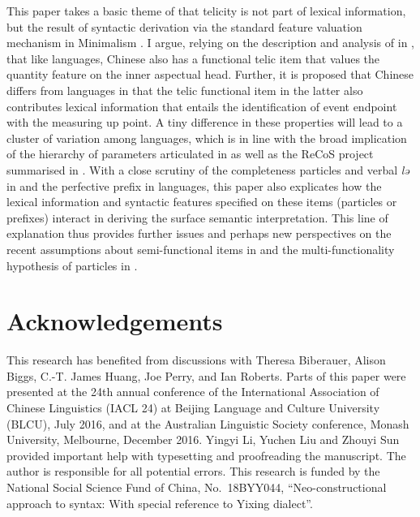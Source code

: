 \documentclass[output=paper]{langsci/langscibook}
\begin{document}
This paper takes a basic theme of \textcite{Borer2005b} that telicity is not
part of lexical information, but the result of syntactic derivation via the
standard feature valuation mechanism in Minimalism
\citep{Chomsky2000,Chomsky2001}. I argue, relying on the description and
analysis of  in \textcite{Huxuhui2016}, that like
languages, Chinese also has a functional telic item that values the quantity
feature on the inner aspectual head.  Further, it is proposed
that Chinese differs from  languages in that the telic functional item in
the latter also contributes lexical information that entails the identification
of event endpoint with the measuring up point. A tiny difference in these
properties will lead to a cluster of variation among languages, which is in
line with the broad implication of the hierarchy of parameters articulated in \textcite{RobHol2010} as well as the ReCoS project
summarised in \textcite{robertsonline}. With a close scrutiny of the
completeness particles and verbal \emph{lə} in  and the
perfective prefix in  languages, this paper also explicates how the
lexical information and syntactic features specified on these items (particles
or prefixes) interact in deriving the surface semantic interpretation. This
line of explanation thus provides further issues and perhaps new perspectives
on the recent assumptions about semi-functional items in
\textcite{huang2015syntactic} and the multi-functionality hypothesis of
particles in \textcite{Biberauer2017,Biberauer2017c}.



\printchapterglossary{}

\section*{Acknowledgements}\largerpage

This research has benefited from discussions with Theresa Biberauer, Alison
Biggs, C.-T. James Huang, Joe Perry, and Ian Roberts. Parts of this paper were
presented at the 24th annual conference of the International Association of Chinese
Linguistics (IACL 24) at Beijing Language and Culture University (BLCU), July
2016, and at the Australian Linguistic Society conference, Monash University,
Melbourne, December 2016. Yingyi Li, Yuchen Liu and Zhouyi Sun provided
important help with typesetting and proofreading the manuscript. The
author is responsible for all potential errors. This research is funded by
the National Social Science Fund of China, No.\ 18BYY044,
\enquote{Neo-constructional approach to syntax: With special reference to
Yixing dialect}.

{\sloppy
\printbibliography[heading=subbibliography,notkeyword=this]
}
\end{document}
